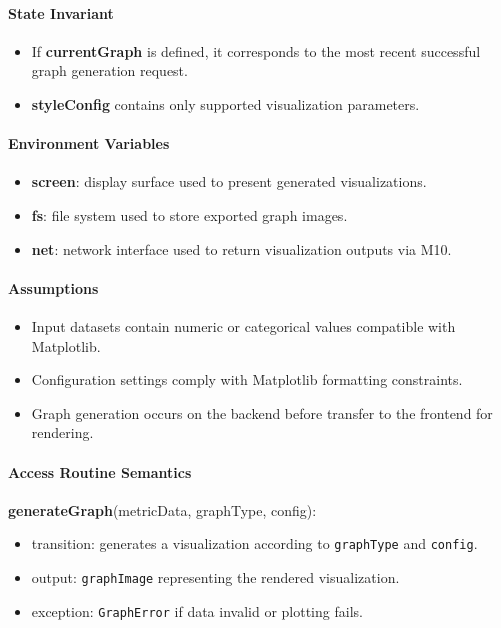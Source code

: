 \documentclass[12pt, titlepage]{article}
\begin{document}
\paragraph{State Invariant}
\begin{itemize}
  \item If \textbf{currentGraph} is defined, it corresponds to the most recent successful graph generation request.
  \item \textbf{styleConfig} contains only supported visualization parameters.
\end{itemize}

\paragraph{Environment Variables}
\begin{itemize}
  \item \textbf{screen}: display surface used to present generated visualizations.
  \item \textbf{fs}: file system used to store exported graph images.
  \item \textbf{net}: network interface used to return visualization outputs via M10.
\end{itemize}

\paragraph{Assumptions}
\begin{itemize}
  \item Input datasets contain numeric or categorical values compatible with Matplotlib.
  \item Configuration settings comply with Matplotlib formatting constraints.
  \item Graph generation occurs on the backend before transfer to the frontend for rendering.
\end{itemize}

\paragraph{Access Routine Semantics}

\noindent \textbf{generateGraph}(metricData, graphType, config):
\begin{itemize}
  \item transition: generates a visualization according to \texttt{graphType} and \texttt{config}.
  \item output: \texttt{graphImage} representing the rendered visualization.
  \item exception: \texttt{GraphError} if data invalid or plotting fails.
\end{itemize}
\end{document}
